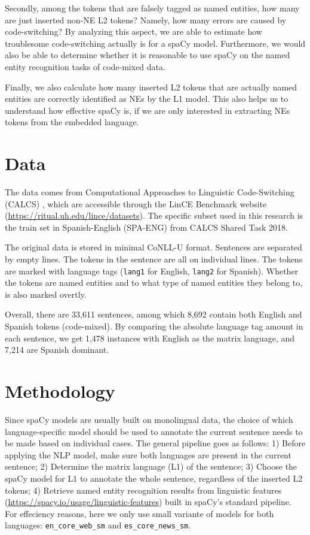 \documentclass[11pt]{article}
\begin{document}
Secondly, among the tokens that are falsely tagged as named entities, how many are just inserted non-NE L2 tokens? Namely, how many errors are caused by code-switching? By analyzing this aspect, we are able to estimate how troublesome code-switching actually is for a spaCy model. Furthermore, we would also be able to determine whether it is reasonable to use spaCy on the named entity recognition tasks of code-mixed data.


Finally, we also calculate how many inserted L2 tokens that are actually named entities are correctly identified as NEs by the L1 model. This also helps us to understand how effective spaCy is, if we are only interested in extracting NEs tokens from the embedded language.


\section{Data}

The data comes from Computational Approaches to Linguistic Code-Switching (CALCS) \citep{aguilaretal2018calcs}, which are accessible through the LinCE Benchmark website (\href{https://ritual.uh.edu/lince/datasets}{https://ritual.uh.edu/lince/datasets}). The specific subset used in this research is the train set in Spanish-English (SPA-ENG) from CALCS Shared Task 2018.

The original data is stored in minimal CoNLL-U format. Sentences are separated by empty lines. The tokens in the sentence are all on individual lines. The tokens are marked with language tags (\texttt{lang1} for English, \texttt{lang2} for Spanish). Whether the tokens are named entities and to what type of named entities they belong to, is also marked overtly.

Overall, there are 33,611 sentences, among which 8,692 contain both English and Spanish tokens (code-mixed). By comparing the absolute language tag amount in each sentence, we get 1,478 instances with English as the matrix language, and 7,214 are Spanish dominant.


\section{Methodology}

Since spaCy models are usually built on monolingual data, the choice of which language-specific model should be used to annotate the current sentence needs to be made based on individual cases. The general pipeline goes as follows: 1) Before applying the NLP model, make sure both languages are present in the current sentence; 2) Determine the matrix language (L1) of the sentence; 3) Choose the spaCy model for L1 to annotate the whole sentence, regardless of the inserted L2 tokens; 4) Retrieve named entity recognition results from linguistic features (\href{https://spacy.io/usage/linguistic-features}{https://spacy.io/usage/linguistic-features}) built in spaCy's standard pipeline. For effeciency reasons, here we only use small variante of models for both languages: \texttt{en\_core\_web\_sm} and \texttt{es\_core\_news\_sm}.
\end{document}
